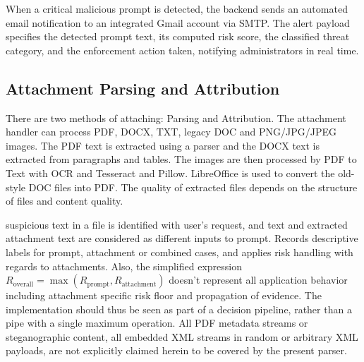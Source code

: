 \documentclass[conference]{IEEEtran}
\begin{document}
When a critical malicious prompt is detected, the backend sends an automated email notification to an integrated Gmail account via SMTP. The alert payload specifies the detected prompt text, its computed risk score, the classified threat category, and the enforcement action taken, notifying administrators in real time.



\subsection{Attachment Parsing and Attribution}
There are two methods of attaching: Parsing and Attribution. The attachment handler can process PDF, DOCX, TXT, legacy DOC and PNG/JPG/JPEG images. The PDF text is extracted using a parser and the DOCX text is extracted from paragraphs and tables. The images are then processed by PDF to Text with OCR and Tesseract and Pillow. LibreOffice is used to convert the old-style DOC files into PDF. The quality of extracted files depends on the structure of files and content quality.

suspicious text in a file is identified with user's request, and text and extracted attachment text are considered as different inputs to prompt. Records descriptive labels for prompt, attachment or combined cases, and applies risk handling with regards to attachments. Also, the simplified expression $R_{\text{overall}} = \max(R_{\text{prompt}}, R_{\text{attachment}})$ doesn't represent all application behavior including attachment specific risk floor and propagation of evidence. The implementation should thus be seen as part of a decision pipeline, rather than a pipe with a single maximum operation. All PDF metadata streams or steganographic content, all embedded XML streams in random or arbitrary XML payloads, are not explicitly claimed herein to be covered by the present parser.
\end{document}

